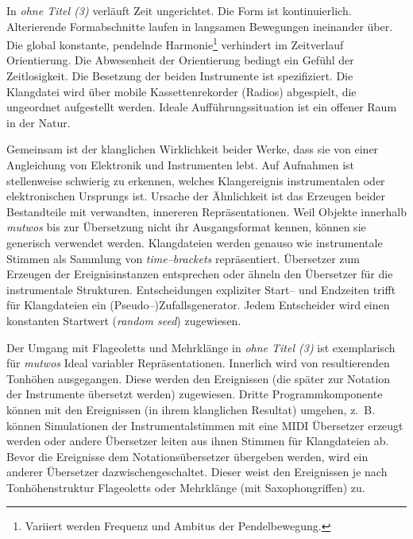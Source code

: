 \documentclass[12pt,a4paper,ngerman]{article}
\begin{document}
\smallskip

In \emph{ohne Titel (3)} verläuft Zeit ungerichtet.
Die Form ist kontinuierlich.
Alterierende Formabschnitte laufen in langsamen Bewegungen ineinander über.
Die global konstante, pendelnde Harmonie\footnote{%
    Variiert werden Frequenz und Ambitus der Pendelbewegung.
} verhindert im Zeitverlauf Orientierung.
Die Abwesenheit der Orientierung bedingt ein Gefühl der Zeitlosigkeit.
Die Besetzung der beiden Instrumente ist spezifiziert.
Die Klangdatei wird über mobile Kassettenrekorder (Radios) abgespielt, die ungeordnet aufgestellt werden.
Ideale Aufführungssituation ist ein offener Raum in der Natur.

\bigskip

Gemeinsam ist der klanglichen Wirklichkeit beider Werke, dass sie von einer Angleichung von Elektronik und Instrumenten lebt.
Auf Aufnahmen ist stellenweise schwierig zu erkennen, welches Klangereignis instrumentalen oder elektronischen Ursprungs ist.
Ursache der Ähnlichkeit ist das Erzeugen beider Bestandteile mit verwandten, innereren Repräsentationen.
Weil Objekte innerhalb \emph{mutwos} bis zur Übersetzung nicht ihr Ausgangsformat kennen, können sie generisch verwendet werden.
Klangdateien werden genauso wie instrumentale Stimmen als Sammlung von \emph{time--brackets} repräsentiert.
Übersetzer zum Erzeugen der Ereignisinstanzen entsprechen oder ähneln den Übersetzer für die instrumentale Strukturen.
Entscheidungen expliziter Start-- und Endzeiten trifft für Klangdateien ein (Pseudo--)Zufallsgenerator.
Jedem Entscheider wird einen konstanten Startwert (\emph{random seed}) zugewiesen.

\bigskip

Der Umgang mit Flageoletts und Mehrklänge in \emph{ohne Titel (3)} ist exemplarisch für \emph{mutwos} Ideal variabler Repräsentationen.
Innerlich wird von resultierenden Tonhöhen ausgegangen.
Diese werden den Ereignissen (die später zur Notation der Instrumente übersetzt werden) zugewiesen.
Dritte Programmkomponente können mit den Ereignissen (in ihrem klanglichen Resultat) umgehen, z.~B. können Simulationen der Instrumentalstimmen mit eine MIDI Übersetzer erzeugt werden oder andere Übersetzer leiten aus ihnen Stimmen für Klangdateien ab.
Bevor die Ereignisse dem Notationsübersetzer übergeben werden, wird ein anderer Übersetzer dazwischengeschaltet.
Dieser weist den Ereignissen je nach Tonhöhenstruktur Flageoletts oder Mehrklänge (mit Saxophongriffen) zu.

\smallskip
\end{document}
